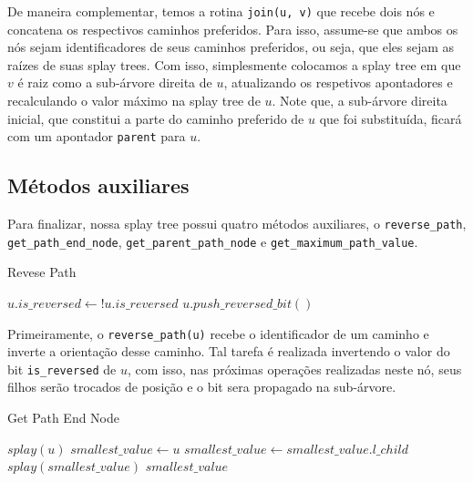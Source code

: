 De maneira complementar, temos a rotina \texttt{join(u, v)} que recebe dois nós e concatena os respectivos caminhos preferidos. Para isso, assume-se que ambos os nós sejam identificadores de seus caminhos preferidos, ou seja, que eles sejam as raízes de suas splay trees. Com isso, simplesmente colocamos a splay tree em que $v$ é raiz como a sub-árvore direita de $u$, atualizando os respetivos apontadores e recalculando o valor máximo na splay tree de $u$. Note que, a sub-árvore direita inicial, que constitui a parte do caminho preferido de $u$ que foi substituída, ficará com um apontador \texttt{parent} para $u$.

\subsection{Métodos auxiliares}
\label{subsection:lct-splay-aux}

Para finalizar, nossa splay tree possui quatro métodos auxiliares, o \texttt{reverse\_path}, \texttt{get\_path\_end\_node}, \texttt{get\_parent\_path\_node} e \texttt{get\_maximum\_path\_value}.

\begin{algorithm}[h!]
    \caption{Revese Path}\label{splay:reverse-path}
    \begin{algorithmic}
        \State $u.is\_reversed \gets !u.is\_reversed$
        \State $u.push\_reversed\_bit()$ 
        \EndFunction
    \end{algorithmic}
\end{algorithm}

Primeiramente, o \texttt{reverse\_path(u)} recebe o identificador de um caminho e inverte a orientação desse caminho. Tal tarefa é realizada invertendo o valor do bit \texttt{is\_reversed} de $u$, com isso, nas próximas operações realizadas neste nó, seus filhos serão trocados de posição e o bit sera propagado na sub-árvore.

\begin{algorithm}[h!]
    \caption{Get Path End Node}\label{splay:get-path-end}
    \begin{algorithmic}
        \State $splay(u)$
        \State $smallest\_value \gets u$
        \State $smallest\_value \gets smallest\_value.l\_child$
        \EndWhile
        \State $splay(smallest\_value)$ 
        \State \Return $smallest\_value$
        \EndFunction
    \end{algorithmic}
\end{algorithm}

